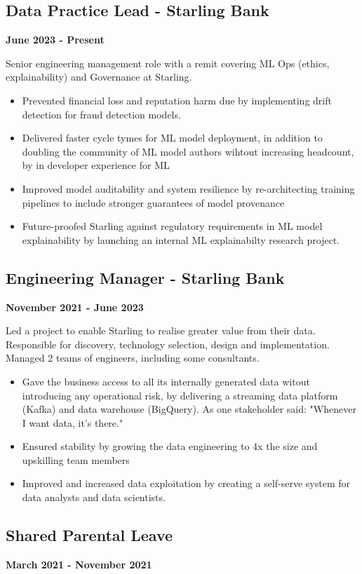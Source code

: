 \documentclass[a4paper]{scrartcl}
\begin{document}
\subsection*{Data Practice Lead - Starling Bank}
\textbf{June 2023 - Present}

Senior engineering management role with a remit covering ML Ops
(ethics,
explainability) and Governance at Starling.
\begin{itemize}
	\item Prevented financial loss and reputation harm due by implementing
	      drift detection for fraud detection models.
	\item Delivered faster cycle tymes for ML model deployment, in addition to doubling the community of ML model authors wihtout increasing headcount, by in developer experience for ML
	\item Improved model auditability and system resilience by re-architecting training pipelines to include stronger guarantees of model provenance
	\item Future-proofed Starling against regulatory requirements in ML model explainability
	      by launching an internal ML explainabilty research project.
\end{itemize}

\subsection*{Engineering Manager - Starling Bank}
\textbf{November 2021 - June 2023}

Led a project to enable Starling to realise greater value from their data. Responsible for discovery, technology selection, design and implementation. Managed 2 teams of engineers, including some consultants.
\begin{itemize}
	\item Gave the business access to all its internally generated data witout introducing any operational risk, by delivering a streaming data platform (Kafka) and data warehouse (BigQuery). As one stakeholder said: "Whenever I want data, it's there."
	\item Ensured stability by growing the data engineering to 4x the size and upskilling team members
	\item Improved and increased data exploitation by creating a self-serve
	      system for data analysts and data scientists.
\end{itemize}

\subsection*{Shared Parental Leave}
\textbf{March 2021 - November 2021}
\end{document}
